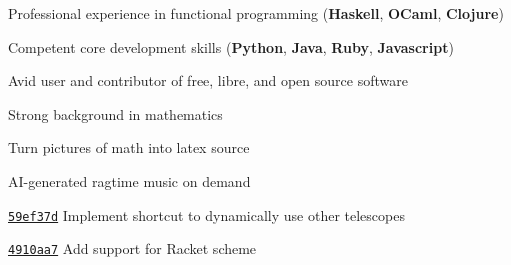 
\begin{tightitemize}
    \item Professional experience in functional programming (\textbf{Haskell}, 
        \textbf{OCaml},
        \textbf{Clojure})
    \item Competent core development skills (\textbf{Python}, \textbf{Java}, 
    \textbf{Ruby}, \textbf{Javascript})
    \item Avid user and contributor of free, libre, and open source software
    \item Strong background in mathematics
\end{tightitemize}

\bigskip
{}

Turn pictures of math into latex source

\smalldivider

AI-generated ragtime music on demand

\smallskip




\href{https://github.com/nvim-lua/telescope.nvim/commit/59ef37ded43a77a4c0f35be434f1ea72a407ce84}{\texttt{59ef37d}} 
Implement shortcut to dynamically use other telescopes

\smalldivider

\href{https://github.com/ujihisa/repl.vim/commit/4910aa7d7b0c7abda92dcfdb4cde030fb839091d}{\texttt{4910aa7}} 
Add support for Racket scheme

\smallskip
{}

\smallskip
{}

\divider


